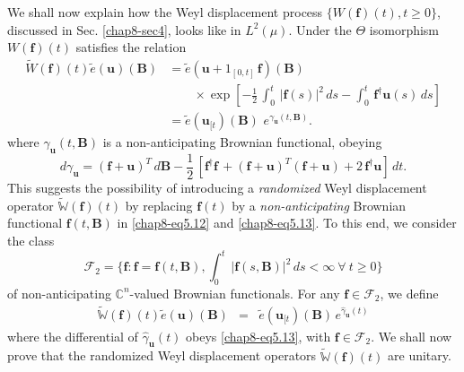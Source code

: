 We shall now explain how the Weyl displacement process $\{W(\mathbf{f})(t), t\geq 0\}$, discussed in Sec. \ref{chap8-sec4}, looks like in $L^2(\mu)$. Under the $\Theta$ isomorphism $W(\mathbf{f})(t)$ satisfies the relation   
\begin{align}
\widetilde{W}(\mathbf{f})(t)\widetilde{e}(\mathbf{u})(\mathbf{B}) &= \widetilde{e}(\mathbf{u}+1_{[0,t]}\, \mathbf{f})(\mathbf{B}) \, \,\nonumber \\ 
& \qquad \times {\exp}\left[-\frac{1}{2}\, \int_0^t\, \vert \mathbf{f}(s)\vert^2\, ds -\int_0^t\, \mathbf{f}^\dag\mathbf{u}(s)\, ds\right] \nonumber \\
&=\widetilde{e}(\mathbf{u}_{[t})(\mathbf{B})\,\, e^{\gamma_{\mathbf{u}}(t,\mathbf{B})}. 
\label{chap8-eq5.12}
\end{align}     
where $\gamma_{\mathbf{u}}(t,\mathbf{B})$ is a non-anticipating Brownian functional, obeying  
\begin{equation} 
d\gamma_{\mathbf{u}}=  (\mathbf{f}+\mathbf{u})^T\, d\mathbf{B}-\frac{1}{2}\,\left[ \mathbf{f}^\dag\mathbf{f}\, +
(\mathbf{f}+\mathbf{u})^T(\mathbf{f}+\mathbf{u})+2\,\mathbf{f}^\dag\mathbf{u} \right]\, dt. \label{chap8-eq5.13}
\end{equation}
This suggests the possibility of introducing a {\it randomized} Weyl displacement operator $\widetilde{\mathbb{W}}(\mathbf{f})(t)$ by replacing $\mathbf{f}(t)$ by a {\it non-anticipating} Brownian functional $\mathbf{f}(t,\mathbf{B})$ in \eqref{chap8-eq5.12} and  \eqref{chap8-eq5.13}. To this end, we consider the class  
$$
\mathcal{F}_2 = \{\mathbf{f}: \mathbf{f}=\mathbf{f}(t,\mathbf{B}), \int_{0}^{t}\, \vert \mathbf{f}(s,\mathbf{B})\vert^2\, ds <\infty \ \forall\ t\geq 0\}
$$  
of non-anticipating  $\mathbb{C}^n$-valued   Brownian functionals.  For any $\mathbf{f}\in \mathcal{F}_2$, we define
\begin{eqnarray}
\widetilde{\mathbb{W}}(\mathbf{f})(t)\widetilde{e}(\mathbf{u})(\mathbf{B})&=&
\widetilde{e}(\mathbf{u}_{[t})(\mathbf{B})\, e^{\hat{\gamma}_\mathbf{u}(t)} \label{chap8-eq5.14}
\end{eqnarray}  
where the differential of $\hat{\gamma}_\mathbf{u}(t)$ obeys  \eqref{chap8-eq5.13}, with $\mathbf{f}\in \mathcal{F}_2$.  We shall now prove that the randomized Weyl displacement operators $\widetilde{\mathbb{W}}(\mathbf{f})(t)$ are unitary.  

